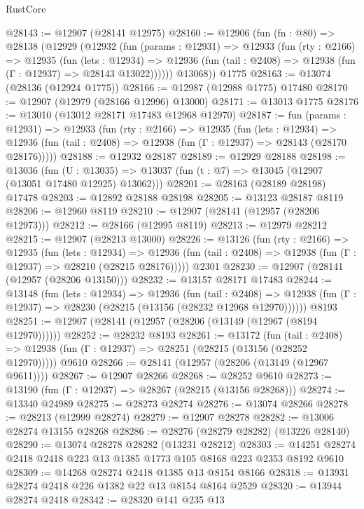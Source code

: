 \begin{lexlean}{RustCore}
\begin{coremodule}
@28143 := @12907 (@28141 @12975)
@28160 := @12906
    (fun (fn : @80) =>
    @28138
      (@12929
        (@12932
          (fun (params : @12931) =>
          @12933
            (fun (rty : @2166) =>
            @12935
              (fun (lets : @12934) =>
              @12936 (fun (tail : @2408) => @12938 (fun (Γ : @12937) => @28143 @13022))))))
        @13068))
    @1775
@28163 := @13074 (@28136 (@12924 @1775))
@28166 := @12987 (@12988 @1775) @17480
@28170 := @12907 (@12979 (@28166 @12996) @13000)
@28171 := @13013 @1775
@28176 := @13010 (@13012 @28171 @17483 @12968 @12970)
@28187 := fun (params : @12931) =>
  @12933
    (fun (rty : @2166) =>
    @12935
      (fun (lets : @12934) =>
      @12936 (fun (tail : @2408) => @12938 (fun (Γ : @12937) => @28143 (@28170 @28176)))))
@28188 := @12932 @28187
@28189 := @12929 @28188
@28198 := @13036
    (fun (U : @13035) => @13037 (fun (t : @7) => @13045 (@12907 (@13051 @17480 @12925) @13062)))
@28201 := @28163 (@28189 @28198) @17478
@28203 := @12892 @28188 @28198
@28205 := @13123 @28187 @8119
@28206 := @12960 @8119
@28210 := @12907 (@28141 (@12957 (@28206 @12973)))
@28212 := @28166 (@12995 @8119)
@28213 := @12979 @28212
@28215 := @12907 (@28213 @13000)
@28226 := @13126
    (fun (rty : @2166) =>
    @12935
      (fun (lets : @12934) =>
      @12936 (fun (tail : @2408) => @12938 (fun (Γ : @12937) => @28210 (@28215 @28176)))))
    @2301
@28230 := @12907 (@28141 (@12957 (@28206 @13150)))
@28232 := @13157 @28171 @17483
@28244 := @13148
    (fun (lets : @12934) =>
    @12936
      (fun (tail : @2408) =>
      @12938 (fun (Γ : @12937) => @28230 (@28215 (@13156 (@28232 @12968 @12970))))))
    @8193
@28251 := @12907 (@28141 (@12957 (@28206 (@13149 (@12967 (@8194 @12970))))))
@28252 := @28232 @8193
@28261 := @13172
    (fun (tail : @2408) => @12938 (fun (Γ : @12937) => @28251 (@28215 (@13156 (@28252 @12970)))))
    @9610
@28266 := @28141 (@12957 (@28206 (@13149 (@12967 @9611))))
@28267 := @12907 @28266
@28268 := @28252 @9610
@28273 := @13190 (fun (Γ : @12937) => @28267 (@28215 (@13156 @28268)))
@28274 := @13340 @24989
@28275 := @28273 @28274
@28276 := @13074 @28266
@28278 := @28213 (@12999 @28274)
@28279 := @12907 @28278
@28282 := @13006 @28274 @13155 @28268
@28286 := @28276 (@28279 @28282) (@13226 @28140)
@28290 := @13074 @28278 @28282 (@13231 @28212)
@28303 := @14251 @28274 @2418 @2418 @223 @13 @1385 @1773 @105 @8168 @223 @2353 @8192 @9610
@28309 := @14268 @28274 @2418 @1385 @13 @8154 @8166
@28318 := @13931 @28274 @2418 @226 @1382 @22 @13 @8154 @8164 @2529
@28320 := @13944 @28274 @2418
@28342 := @28320
    @141
    @235
    @13

\end{coremodule}
\end{lexlean}
